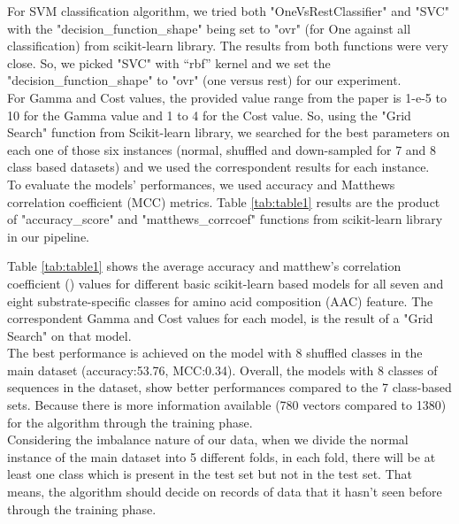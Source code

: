    For SVM classification algorithm, we tried both "OneVsRestClassifier" and "SVC" with the "decision\_function\_shape" 
    being set to "ovr" (for One against all classification) from scikit-learn library. The results from both functions 
    were very close. So, we picked "SVC" with “rbf” kernel and we set the "decision\_function\_shape" to "ovr" (one versus rest) 
    for our experiment.\\

    For Gamma and Cost values, the provided value range from the paper is 1-e-5 to 10 for the Gamma value and 1 to 4 for 
    the Cost value. So, using the "Grid Search" function from Scikit-learn library, we searched for the best parameters 
    on each one of those six instances (normal, shuffled and down-sampled for 7 and 8 class based datasets) and we 
    used the correspondent results for each instance.\\
  

    To evaluate the models' performances, we used accuracy and Matthews correlation coefficient (MCC) metrics.
    Table \ref{tab:table1} results are the product of "accuracy\_score" and "matthews\_corrcoef" functions from scikit-learn 
    library in our pipeline.\\

        
    Table \ref{tab:table1} shows the average accuracy and matthew's correlation coefficient () values for different 
    basic scikit-learn based models for all seven and eight substrate-specific classes for amino acid composition (AAC) feature. 
    The correspondent Gamma and Cost values for each model, is the result of a "Grid Search" on that model.\\

    The best performance is achieved on the model with 8 shuffled classes in the main dataset (accuracy:53.76, MCC:0.34). 
    Overall, the models with 8 classes of sequences in the dataset, show better performances compared to the 7 class-based sets. 
    Because there is more information available (780 vectors compared to 1380) for the algorithm through the training phase.\\

    Considering the imbalance nature of our data, when we divide the normal instance of the main dataset into 5 different folds, 
    in each fold, there will be at least one class which is present in the test set but not in the test set. That means, 
    the algorithm should decide on records of data that it hasn’t seen before through the training phase.\\

